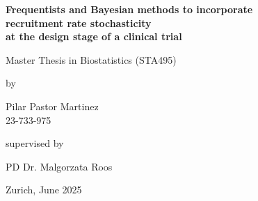 \renewcommand\familydefault{\sfdefault} 


\thispagestyle{empty}
\renewcommand{\baselinestretch}{1.5}\normalfont
\begin{center}
\setlength{\parindent}{0cm}
\bf\Large%
Frequentists and Bayesian methods to incorporate \\
recruitment rate stochasticity \\
at the design stage of a clinical trial
\normalfont



\hrulefill

\vspace*{4cm}

\large
Master Thesis in Biostatistics (STA495) %
\vspace*{12mm}

by

\vspace*{12mm}

Pilar Pastor Martinez\\
\small 23-733-975\\
\normalfont
\vspace*{4cm}

supervised by

\vspace*{1cm}

PD Dr. Malgorzata Roos 
\vfill

Zurich, June 2025
\end{center}
\renewcommand\familydefault{\rmdefault}%
\renewcommand{\baselinestretch}{1.0}\rm 
\setcounter{page}{0}
\newpage
\vspace*{12cm}~\thispagestyle{empty}
\newpage
